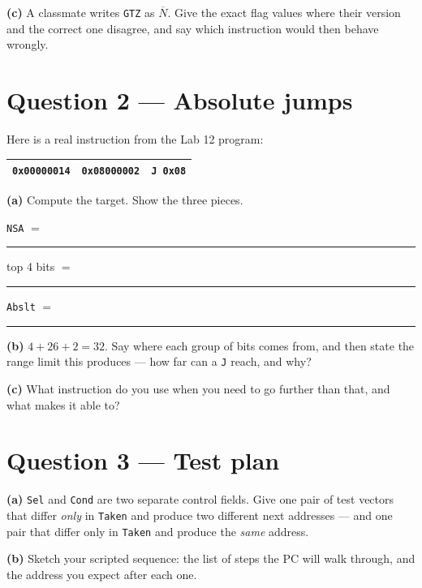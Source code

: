 \documentclass[11pt]{article}
\newcommand{\code}[1]{\texttt{#1}}
\newcommand{\answerbox}[1]{\vspace{2pt}\fbox{\parbox[c][#1][c]{\dimexpr\linewidth-2\fboxsep-2\fboxrule}{\ }}\vspace{4pt}}
\begin{document}
\answerbox{1.6cm}

\textbf{(c)} A classmate writes \code{GTZ} as $\overline{N}$. Give the exact
flag values where their version and the correct one disagree, and say which
instruction would then behave wrongly.

\answerbox{2.0cm}

\section*{Question 2 --- Absolute jumps}

Here is a real instruction from the Lab 12 program:

\begin{center}
\begin{tabular}{lll}
\toprule
\code{0x00000014} & \code{0x08000002} & \code{J 0x08} \\
\bottomrule
\end{tabular}
\end{center}

\textbf{(a)} Compute the target. Show the three pieces.

\vspace{4pt}
\code{NSA} $=$ \rule{3cm}{0.4pt} \hfill
top 4 bits $=$ \rule{2.5cm}{0.4pt} \hfill
\code{Abslt} $=$ \rule{4cm}{0.4pt}
\vspace{8pt}

\textbf{(b)} $4 + 26 + 2 = 32$. Say where each group of bits comes from, and
then state the range limit this produces --- how far can a \code{J} reach, and
why?

\answerbox{2.4cm}

\textbf{(c)} What instruction do you use when you need to go further than that,
and what makes it able to?

\answerbox{1.4cm}

\section*{Question 3 --- Test plan}

\textbf{(a)} \code{Sel} and \code{Cond} are two separate control fields. Give
one pair of test vectors that differ \emph{only} in \code{Taken} and produce
two different next addresses --- and one pair that differ only in \code{Taken}
and produce the \emph{same} address.

\answerbox{2.6cm}

\textbf{(b)} Sketch your scripted sequence: the list of steps the PC will walk
through, and the address you expect after each one.
\end{document}
